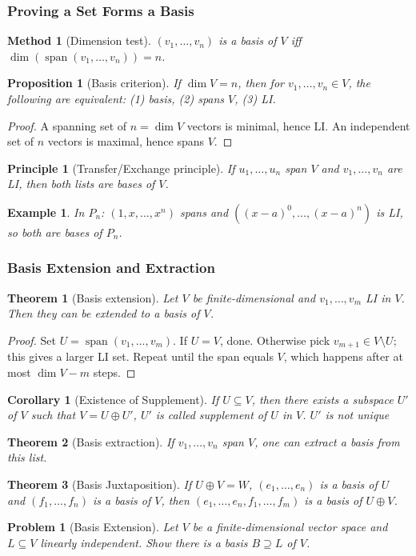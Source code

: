 \documentclass{article}
\newtheorem{theorem}{Theorem}
\newtheorem{corollary}{Corollary}[theorem]
\newtheorem{problem}{Problem}
\newtheorem*{example}{Example}
\newtheorem{proposition}{Proposition}
\newtheorem{method}{Method}
\newtheorem{principle}{Principle}
\newcommand{\Span}{\operatorname{span}}
\begin{document}
\subsubsection{Proving a Set Forms a Basis}
\begin{method}[Dimension test]
    $(v_1,\ldots,v_n)$ is a basis of $V$ iff $\dim(\Span(v_1,\ldots,v_n)) = n$.
\end{method}
\begin{proposition}[Basis criterion]
    If $\dim V = n$, then for $v_1,\ldots,v_n \in V$, the following are equivalent: (1) basis, (2) spans $V$, (3) LI.
\end{proposition}
\begin{proof}
    A spanning set of $n=\dim V$ vectors is minimal, hence LI. An independent set of $n$ vectors is maximal, hence spans $V$.
\end{proof}
\begin{principle}[Transfer/Exchange principle]
    If $u_1,\ldots,u_n$ span $V$ and $v_1,\ldots,v_n$ are LI, then both lists are bases of $V$.
\end{principle}
\begin{example}
    In $P_n$: $(1,x,\ldots,x^n)$ spans and $((x-a)^0,\ldots,(x-a)^n)$ is LI, so both are bases of $P_n$.
\end{example}

\subsubsection{Basis Extension and Extraction}

\begin{theorem}[Basis extension]
    Let $V$ be finite-dimensional and $v_1,\ldots,v_m$ LI in $V$. Then they can be extended to a basis of $V$.
\end{theorem}
\begin{proof}
    Set $U=\Span(v_1,\ldots,v_m)$. If $U=V$, done. Otherwise pick $v_{m+1}\in V\setminus U$; this gives a larger LI set. Repeat until the span equals $V$, which happens after at most $\dim V - m$ steps.
\end{proof}
\begin{corollary}[Existence of Supplement]
    If $U\subseteq V$, then there exists a subspace $U'$ of $V$ such that $V = U \oplus U'$, $U'$ is called supplement of $U$ in $V$. $U'$ is not unique
\end{corollary}
\begin{theorem}[Basis extraction]
    If $v_1,\ldots,v_n$ span $V$, one can extract a basis from this list.
\end{theorem}
\begin{theorem}[Basis Juxtaposition]
    If $U \oplus V = W$, $(e_1,\ldots,e_n)$ is a basis of $U$ and $(f_1,\ldots,f_n)$ is a basis of $V$, then $(e_1,\ldots,e_n,f_1,\ldots,f_m)$ is a basis of $U \oplus V$.
\end{theorem}
\begin{problem}[Basis Extension]
    Let $V$ be a finite-dimensional vector space and $L \subseteq V$ linearly independent. Show there is a basis $B \supseteq L$ of $V$.
\end{problem}
\end{document}
